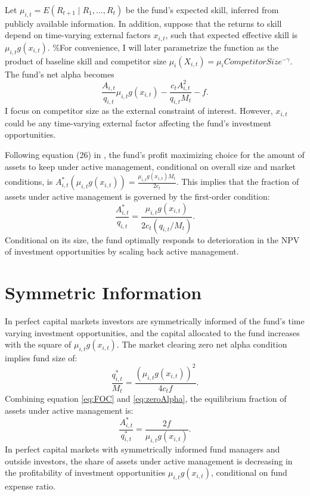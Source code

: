 \documentclass[]{book}
\theoremstyle{definition}
\theoremstyle{definition}
\theoremstyle{definition}
\theoremstyle{remark}
\begin{document}
Let \(\mu_{i,t}=E(R_{t+1}\mid R_1,\ldots,R_t)\) be the fund's expected
skill, inferred from publicly available information. In addition,
suppose that the returns to skill depend on time-varying external
factors \(x_{i,t}\), such that expected effective skill is
\(\mu_{i,t}g(x_{i,t})\). \%For convenience, I will later parametrize the
function as the product of baseline skill and competitor size
\(\mu_i(X_{i,t})=\mu_i CompetitorSize^{-\gamma}\). The fund's net alpha
becomes \begin{equation}
\frac{A_{i,t}}{q_{i,t}}\mu_{i,t}g(x_{i,t})-\frac{c_t A_{i,t}^2}{q_{i,t}M_t}-f. 
\end{equation} I focus on competitor size as the external constraint of
interest. However, \(x_{i,t}\) could be any time-varying external factor
affecting the fund's investment opportunities.

Following equation (26) in \citet{bg04}, the fund's profit maximizing
choice for the amount of assets to keep under active management,
conditional on overall size and market conditions, is
\(A_{i,t}^\ast(\mu_{i,t}g(x_{i,t}))=\frac{\mu_{i,t}g(x_{i,t}) M_t}{2c_t}\).
This implies that the fraction of assets under active management is
governed by the first-order condition: \begin{equation}
\frac{A_{i,t}^\ast}{q_{i,t}}=\frac{\mu_{i,t}g(x_{i,t})}{2c_t(q_{i,t}/M_t)}.
\label{eq:FOC}
\end{equation} Conditional on its size, the fund optimally responds to
deterioration in the NPV of investment opportunities by scaling back
active management.

\hypertarget{symmetric-information}{%
\section{Symmetric Information}\label{symmetric-information}}

In perfect capital markets investors are symmetrically informed of the
fund's time varying investment opportunities, and the capital allocated
to the fund increases with the square of \(\mu_{i,t}g(x_{i,t})\). The
market clearing zero net alpha condition implies fund size of:
\begin{equation}
\frac{q_{i,t}^\ast}{M_t}=\frac{(\mu_{i,t}g(x_{i,t}))^2}{4c_t f}.
\label{eq:zeroAlpha}
\end{equation} Combining equation \eqref{eq:FOC} and \eqref{eq:zeroAlpha},
the equilibrium fraction of assets under active management is:
\begin{equation}
\frac{A_{i,t}^\ast}{q_{i,t}^\ast}=\frac{2f}{\mu_{i,t}g(x_{i,t})}.
\label{eq:capMkt}
\end{equation} In perfect capital markets with symmetrically informed
fund managers and outside investors, the share of assets under active
management is decreasing in the profitability of investment
opportunities \(\mu_{i,t}g(x_{i,t})\), conditional on fund expense
ratio.
\end{document}
